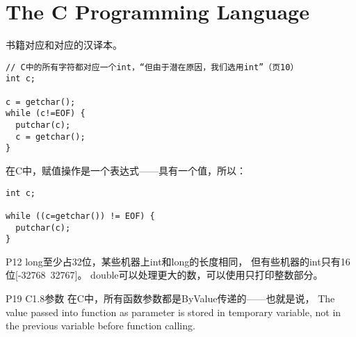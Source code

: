 \section{The C Programming Language}
书籍对应和对应的汉译本。

\begin{lstlisting}
// C中的所有字符都对应一个int，“但由于潜在原因，我们选用int”（页10）
int c;

c = getchar();
while (c!=EOF) {
  putchar(c);
  c = getchar();
}
\end{lstlisting}

在C中，赋值操作是一个表达式——具有一个值，所以：
\begin{lstlisting}
int c;

while ((c=getchar()) != EOF) {
  putchar(c);
}
\end{lstlisting}
P12
long至少占32位，某些机器上int和long的长度相同，
但有些机器的int只有16位[-32768~32767]。
double可以处理更大的数，可以使用只打印整数部分。

P19 C1.8参数
在C中，所有函数参数都是ByValue传递的——也就是说，
The value passed into function as parameter is stored in temporary variable, 
not in the previous variable before function calling.
